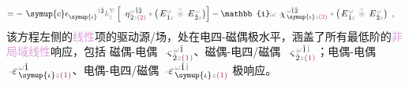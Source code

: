 \begin{subequations}
\begin{align}
	= -~ {\symup{c}} \epsilon^{\hphantom{\symup{\iota}}\mathcolor{gray}{\dot{1}}\dot{2}}_{\symup{\iota}} \mathcolor{gray}{k^\nabla_{\dot{1}}} \left[ \xint{\begin{smallmatrix} ~ \\ {}^{}_{\mathcolor{gray}{-}} \\ ~ \end{smallmatrix}}{17}{\eta}^{\;\! \mathcolor{gray}{\omega} \hat{1} \hat{2}}_{\;\! \dot{2} \mathcolor{gray}{z} \textcolor{Maroon}{(2)}} \mathcolor{gray}{*} \left( \xint{\mathcolor{gray}{-}}{295}{E}^{\;\!\mathcolor{gray}{\omega}}_{\;\! \hat{1} \mathcolor{gray}{z}} ~\mathcolor{gray}{\widetilde \circledast}~ \xint{\mathcolor{gray}{-}}{295}{E}^{\;\!\mathcolor{gray}{\omega}}_{\;\! \hat{2} \mathcolor{gray}{z}} \right) \right] &- \mathbb{i} \mathcolor{gray}{\omega} ~\xint{{}^{}_{\mathcolor{gray}{-}}}{23}{\chi}^{\;\! \mathcolor{gray}{\omega} \hat{1} \hat{2}}_{\;\! \symup{\iota} \mathcolor{gray}{z} \textcolor{Maroon}{(2)}} \mathcolor{gray}{*} \left( \xint{\mathcolor{gray}{-}}{295}{E}^{\;\!\mathcolor{gray}{\omega}}_{\;\! \hat{1} \mathcolor{gray}{z}} ~\mathcolor{gray}{\widetilde \circledast}~ \xint{\mathcolor{gray}{-}}{295}{E}^{\;\!\mathcolor{gray}{\omega}}_{\;\! \hat{2} \mathcolor{gray}{z}} \right)~,
\end{align}
\end{subequations}
该方程左侧的\textcolor{Plum}{线性}项的\textcolor{NavyBlue}{驱动源}/\textcolor{NavyBlue}{场}，处在\textcolor{NavyBlue}{电四-磁偶}极水平，涵盖了所有最低阶的\textcolor{Plum}{非局域}\textcolor{Plum}{线性}响应，包括 \textcolor{NavyBlue}{磁偶-电偶} $\xint{\begin{smallmatrix} ~ \\ {}^{}_{\mathcolor{gray}{-}} \\ ~ \end{smallmatrix}}{13}{\varsigma}^{\;\! \mathcolor{gray}{\omega} \hat{1}}_{\;\! \dot{2} \mathcolor{gray}{z} \textcolor{Maroon}{(1)}}$、\textcolor{NavyBlue}{磁偶-电四/磁偶} $\xint{\begin{smallmatrix} ~ \\ {}^{}_{\mathcolor{gray}{-}} \\ ~ \end{smallmatrix}}{13}{\varsigma}^{\;\! \mathcolor{gray}{\omega} \hat{1} \mathcolor{gray}{\check{1}}}_{\;\! \dot{2} \mathcolor{gray}{z} \textcolor{Maroon}{(1)}}$；\textcolor{NavyBlue}{电偶-电偶} $\xint{\begin{smallmatrix} ~ \\ {}^{}_{\mathcolor{gray}{-}} \\ ~ \end{smallmatrix}}{16}{\varepsilon}^{\;\! \mathcolor{gray}{\omega} \hat{1}}_{\;\! \symup{\iota} \mathcolor{gray}{z} \textcolor{Maroon}{(1)}}$、\textcolor{NavyBlue}{电偶-电四/磁偶} $\xint{\begin{smallmatrix} ~ \\ {}^{}_{\mathcolor{gray}{-}} \\ ~ \end{smallmatrix}}{16}{\varepsilon}^{\;\! \mathcolor{gray}{\omega} \hat{1} \mathcolor{gray}{\check{1}}}_{\;\! \symup{\iota} \mathcolor{gray}{z} \textcolor{Maroon}{(1)}}$ 极响应。

